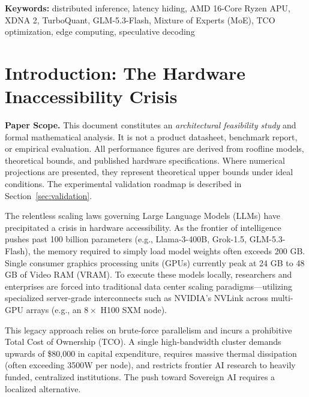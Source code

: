 \documentclass[11pt,a4paper]{article}
\begin{document}
\vspace{0.5cm}
\noindent\textbf{Keywords:} distributed inference, latency hiding, AMD 16-Core Ryzen APU, XDNA 2, TurboQuant, GLM-5.3-Flash, Mixture of Experts (MoE), TCO optimization, edge computing, speculative decoding

\newpage
\tableofcontents
\vspace{1em}

\section{Introduction: The Hardware Inaccessibility Crisis}

\begin{tcolorbox}[colback=AbstractBg, colframe=AbstractBorder, boxrule=0.3pt, arc=3pt, left=8pt, right=8pt, top=6pt, bottom=6pt]
\small\textbf{Paper Scope.} This document constitutes an \textit{architectural feasibility study} and formal mathematical analysis. It is not a product datasheet, benchmark report, or empirical evaluation. All performance figures are derived from roofline models, theoretical bounds, and published hardware specifications. Where numerical projections are presented, they represent theoretical upper bounds under ideal conditions. The experimental validation roadmap is described in Section~\ref{sec:validation}.
\end{tcolorbox}
\vspace{0.5em}

The relentless scaling laws governing Large Language Models (LLMs) have precipitated a crisis in hardware accessibility. As the frontier of intelligence pushes past 100 billion parameters (e.g., Llama-3-400B, Grok-1.5, GLM-5.3-Flash), the memory required to simply load model weights often exceeds 200 GB. Single consumer graphics processing units (GPUs) currently peak at 24 GB to 48 GB of Video RAM (VRAM). To execute these models locally, researchers and enterprises are forced into traditional data center scaling paradigms---utilizing specialized server-grade interconnects such as NVIDIA's NVLink across multi-GPU arrays (e.g., an $8\times$ H100 SXM node).

This legacy approach relies on brute-force parallelism and incurs a prohibitive Total Cost of Ownership (TCO). A single high-bandwidth cluster demands upwards of \$80,000 in capital expenditure, requires massive thermal dissipation (often exceeding 3500W per node), and restricts frontier AI research to heavily funded, centralized institutions. The push toward Sovereign AI requires a localized alternative.
\end{document}
